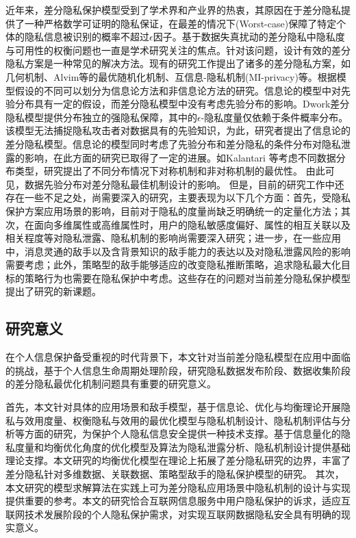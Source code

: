 近年来，差分隐私保护模型受到了学术界和产业界的热衷，其原因在于差分隐私提供了一种严格数学可证明的隐私保证，在最差的情况下(Worst-case)保障了特定个体的隐私信息被识别的概率不超过$\epsilon$因子。基于数据失真扰动的差分隐私中隐私度与可用性的权衡问题也一直是学术研究关注的焦点。针对该问题，设计有效的差分隐私方案是一种常见的解决方法。现有的研究工作提出了诸多的差分隐私方案，如几何机制\cite{ghosh2012universally}、Alvim等\cite{alvim2011differential}的最优随机化机制、互信息-隐私机制(MI-privacy)\cite{wang2016on,mir2012information}等。根据模型假设的不同可以划分为信息论方法和非信息论方法的研究。信息论的模型中对先验分布具有一定的假设，而差分隐私模型中没有考虑先验分布的影响\cite{sarwate2014a}。Dwork差分隐私模型\cite{dwork2006differential,dwork2006calibrating}提供分布独立的强隐私保障，其中的$\epsilon$-隐私度量仅依赖于条件概率分布。该模型无法捕捉隐私攻击者对数据具有的先验知识，为此，研究者提出了信息论的差分隐私模型。信息论的模型同时考虑了先验分布和差分隐私的条件分布对隐私泄露的影响，在此方面的研究已取得了一定的进展\cite{calmon2012privacy,sarwate2014a,cuff2016differential,wang2016on}。如Kalantari 等\cite{kalantari2018robust}考虑不同数据分布类型，研究提出了不同分布情况下对称机制和非对称机制的最优性。 由此可见，数据先验分布对差分隐私最佳机制设计的影响。
但是，目前的研究工作中还存在一些不足之处，尚需要深入的研究，主要表现为以下几个方面：首先，受隐私保护方案应用场景的影响，目前对于隐私的度量尚缺乏明确统一的定量化方法；其次，在面向多维属性或高维属性时，用户的隐私敏感度偏好、属性的相互关联以及相关程度等对隐私泄露、隐私机制的影响尚需要深入研究；进一步，在一些应用中，消息灵通的敌手以及含背景知识的敌手能力的表达以及对隐私泄露风险的影响需要考虑；此外，策略型的敌手能够适应的改变隐私推断策略，追求隐私最大化目标的策略行为也需要在隐私保护中考虑。这些存在的问题对当前差分隐私保护模型提出了研究的新课题。




\subsection{研究意义}
在个人信息保护备受重视的时代背景下，本文针对当前差分隐私模型在应用中面临的挑战，基于个人信息生命周期处理阶段，研究隐私数据发布阶段、数据收集阶段的差分隐私最优化机制问题具有重要的研究意义。

首先，本文针对具体的应用场景和敌手模型，基于信息论、优化与均衡理论开展隐私与效用度量、权衡隐私与效用的最优化模型与隐私机制设计、隐私机制评估与分析等方面的研究，为保护个人隐私信息安全提供一种技术支撑。基于信息量化的隐私度量和均衡优化角度的优化模型及算法为隐私泄露分析、隐私机制设计提供基础理论支撑。本文研究的均衡优化模型在理论上拓展了差分隐私研究的边界，丰富了差分隐私针对多维数据、关联数据、策略型敌手的隐私保护模型的研究。
其次，本文研究的模型求解算法在实践上可为差分隐私应用场景中隐私机制的设计与实现提供重要的参考。本文的研究恰合互联网信息服务中用户隐私保护的诉求，适应互联网技术发展阶段的个人隐私保护需求，对实现互联网数据隐私安全具有明确的现实意义。

